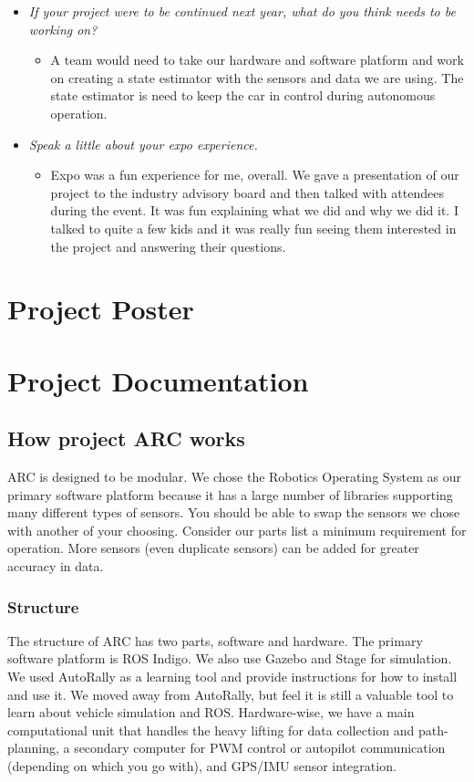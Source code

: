 \documentclass[compsoc,draftclsnofoot,onecolumn,10pt]{IEEEtran}
\begin{document}
\begin{itemize}
    \item \textit{If your project were to be continued next year, what do you think needs to be working on?}
    \begin{itemize}
        \item A team would need to take our hardware and software platform and work on creating a state estimator with the sensors and data we are using. The state estimator is need to keep the car in control during autonomous operation.
    \end{itemize}

    \item \textit{Speak a little about your expo experience.}
    \begin{itemize}
        \item Expo was a fun experience for me, overall. We gave a presentation of our project to the industry advisory board and then talked with attendees during the event. It was fun explaining what we did and why we did it. I talked to quite a few kids and it was really fun seeing them interested in the project and answering their questions.
    \end{itemize}
\end{itemize}

\section{Project Poster}

\section{Project Documentation}

    \subsection{How project ARC works}
    ARC is designed to be modular. We chose the Robotics Operating System as our primary software platform because it has a large number of libraries supporting many different types of sensors. You should be able to swap the sensors we chose with another of your choosing. Consider our parts list a minimum requirement for operation. More sensors (even duplicate sensors) can be added for greater accuracy in data.
        \subsubsection{Structure}
        The structure of ARC has two parts, software and hardware. The primary software platform is ROS Indigo. We also use Gazebo and Stage for simulation. We used AutoRally as a learning tool and provide instructions for how to install and use it. We moved away from AutoRally, but feel it is still a valuable tool to learn about vehicle simulation and ROS. Hardware-wise, we have a main computational unit that handles the heavy lifting for data collection and path-planning, a secondary computer for PWM control or autopilot communication (depending on which you go with), and GPS/IMU sensor integration.\\
\end{document}
